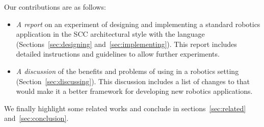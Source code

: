Our contributions are as follows:

\begin{itemize}
\item \emph{A report} on an experiment of designing and implementing a
  standard robotics application in the SCC architectural style with
  the \diaspec{} language (Sections~\ref{sec:designing}
  and~\ref{sec:implementing}). This report includes detailed
  instructions and guidelines to allow further experiments.
\item \emph{A discussion} of the benefits and problems of using \diaspec{} in
  a robotics setting (Section~\ref{sec:discussing}). This discussion
  includes a list of changes to \diaspec{} that would make it a better
  framework for developing new robotics applications.
\end{itemize}

We finally highlight some related works and conclude in
sections~\ref{sec:related} and~\ref{sec:conclusion}.

